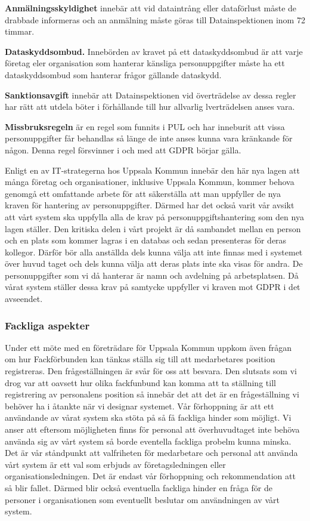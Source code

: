 \documentclass[swedish, a4paper,12pt]{article}
\begin{document}
\textbf{Anmälningsskyldighet} innebär att vid dataintrång eller dataförlust måste de drabbade informeras och an anmälning måste göras till Datainspektionen inom 72 timmar.

\textbf{Dataskyddsombud.} Innebörden av kravet på ett dataskyddsombud är att varje företag eler organisation som hanterar känsliga personuppgifter måste ha ett dataskyddsombud som hanterar frågor gällande dataskydd.

\textbf{Sanktionsavgift} innebär att Datainspektionen vid överträdelse av dessa regler har rätt att utdela böter i förhållande till hur allvarlig lverträdelsen anses vara.

\textbf{Missbruksregeln} är en regel som funnits i PUL och har inneburit att vissa personuppgifter får behandlas så länge de inte anses kunna vara kränkande för någon. Denna regel försvinner i och med att GDPR börjar gälla.

Enligt en av IT-strategerna hos Uppsala Kommun innebär den här nya lagen att många företag och organisationer, inklusive Uppsala Kommun, kommer behova genomgå ett omfattande arbete för att säkerställa att man uppfyller de nya kraven för hantering av personuppgifter. Därmed har det också varit vår avsikt att vårt system ska uppfylla alla de krav på personuppgiftshantering som den nya lagen ställer. Den kritiska delen i vårt projekt är då sambandet mellan en person och en plats som kommer lagras i en databas och sedan presenteras för deras kollegor. Därför bör alla anställda dels kunna välja att inte finnas med i systemet över huvud taget och dels kunna välja att deras plats inte ska visas för andra. De personuppgifter som vi då hanterar är namn och avdelning på arbetsplatsen. Då vårat system ställer dessa krav på samtycke uppfyller vi kraven mot GDPR i det avseendet.
\newpage
\subsubsection{Fackliga aspekter}
Under ett möte med en företrädare för Uppsala Kommun uppkom även frågan om hur Fackförbunden kan tänkas ställa sig till att medarbetares position registreras.
Den frågeställningen är svår för oss att besvara. Den slutsats som vi drog var att oavsett hur olika fackfunbund kan komma att ta ställning till registrering av personalens position så innebär det att det är en frågeställning vi behöver ha i åtankte när vi designar systemet. Vår förhoppning är att ett användande av vårat system ska stöta på så få fackliga hinder som möjligt. Vi anser att eftersom möjligheten finns för personal att överhuvudtaget inte behöva använda sig av vårt system så borde eventella fackliga probelm kunna minska. Det är vår ståndpunkt att valfriheten för medarbetare och personal att använda vårt system är ett val som erbjuds av företagsledningen eller organisationsledningen. Det är endast vår förhoppning och rekommendation att så blir fallet. Därmed blir också eventuella fackliga hinder en fråga för de personer i organisationen som eventuellt beslutar om användningen av vårt system.
\end{document}
